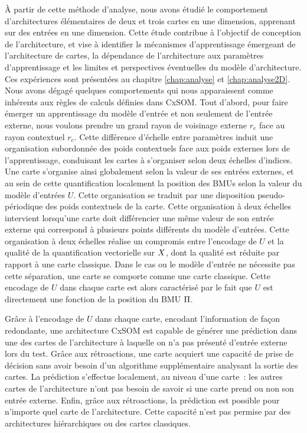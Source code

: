 \`A partir de cette méthode d'analyse, nous avons étudié le comportement d'architectures élémentaires de deux et trois cartes en une dimension, apprenant sur des entrées en une dimension. Cette étude contribue à l'objectif de conception de l'architecture, et vise à identifier ls mécanismes d'apprentissage émergeant de l'architecture de cartes, la dépendance de l'architecture aux paramètres d'apprentissage et les limites et perspectives éventuelles du modèle d'architecture.
Ces expériences sont présentées au chapitre \ref{chap:analyse} et \ref{chap:analyse2D}.
Nous avons dégagé quelques comportements qui nous apparaissent comme inhérents aux règles de calculs définies dans CxSOM.
Tout d'abord, pour faire émerger un apprentissage du modèle d'entrée et non seulement de l'entrée externe, nous voulons prendre un grand rayon de voisinage externe $r_e$ face au rayon contextuel $r_c$. 
Cette différence d'échelle entre paramètres induit une organisation subordonnée des poids contextuels face aux poids externes lors de l'apprentissage, conduisant les cartes à s'organiser selon deux échelles d'indices. Une carte s'organise ainsi globalement selon la valeur de ses entrées externes, et au sein de cette quantification localement la position des BMUs selon la valeur du modèle d'entrées $U$. Cette organisation se traduit par une disposition pseudo-périodique des poids contextuels de la carte.
Cette organisation à deux échelles intervient lorsqu'une carte doit différencier une même valeur de son entrée externe qui correspond à plusieurs points différents du modèle d'entrées. 
Cette organisation à deux échelles réalise un compromis entre l'encodage de $U$ et la qualité de la quantification vectorielle sur $X$, dont la qualité est réduite par rapport à une carte classique. Dans le cas ou le modèle d'entrée ne nécessite pas cette séparation, une carte se comporte comme une carte classique.
Cette encodage de $U$ dans chaque carte est alors caractérisé par le fait que $U$ est directement une fonction de la position du BMU $\Pi$.
    
Grâce à l'encodage de $U$ dans chaque carte, encodant l'information de façon redondante, une architecture CxSOM est capable de générer une prédiction dans une des cartes de l'architecture à laquelle on n'a pas présenté d'entrée externe lors du test. Grâce aux rétroactions, une carte acquiert une capacité de prise de décision sans avoir besoin d'un algorithme supplémentaire analysant la sortie des cartes. La prédiction s'effectue localement, au niveau d'une carte~: les autres cartes de l'architecture n'ont pas besoin de savoir si une carte prend ou non son entrée externe. Enfin, grâce aux rétroactions, la prédiction est possible pour n'importe quel carte de l'architecture. Cette capacité n'est pas permise par des architectures hiérarchiques ou des cartes classiques.
   
